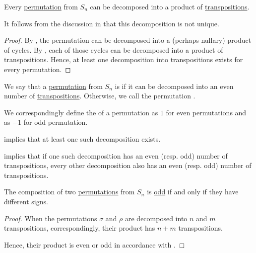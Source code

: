 \begin{proposition}\label{thm:permutation_decomposition_existence}
  Every \hyperref[def:symmetric_group]{permutation} from \( S_n \) can be decomposed into a product of \hyperref[def:cyclic_permutation]{transpositions}.
\end{proposition}
\begin{comments}
  \item It follows from the discussion in  that this decomposition is not unique.
\end{comments}
\begin{proof}
  By , the permutation can be decomposed into a (perhaps nullary) product of cycles. By , each of those cycles can be decomposed into a product of transpositions. Hence, at least one decomposition into transpositions exists for every permutation.
\end{proof}

\begin{definition}\label{def:permutation_parity}\mimprovised
  We say that a \hyperref[def:symmetric_group]{permutation} from \( S_n \) is  if it can be decomposed into an even number of \hyperref[def:cyclic_permutation]{transpositions}. Otherwise, we call the permutation .

  We correspondingly define the  of a permutation as \( 1 \) for even permutations and as \( -1 \) for odd permutation.
\end{definition}
\begin{defproof}
   implies that at least one such decomposition exists.

   implies that if one such decomposition has an even (resp. odd) number of transpositions, every other decomposition also has an even (resp. odd) number of transpositions.
\end{defproof}

\begin{proposition}\label{thm:permutation_product_parity}
  The composition of two \hyperref[def:symmetric_group]{permutations} from \( S_n \) is \hyperref[def:permutation_parity]{odd} if and only if they have different signs.
\end{proposition}
\begin{proof}
  When the permutations \( \sigma \) and \( \rho \) are decomposed into \( n \) and \( m \) transpositions, correspondingly, their product has \( n + m \) transpositions.

  Hence, their product is even or odd in accordance with .
\end{proof}

